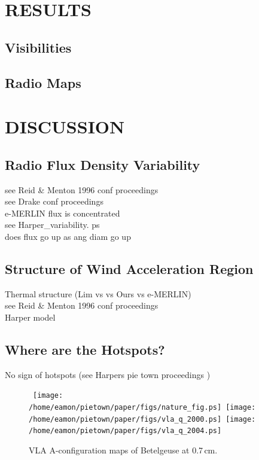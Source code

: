 \documentclass[iop]{emulateapj}
\begin{document}
\section{RESULTS} 
\subsection{Visibilities} 
\subsection{Radio Maps} 



\section{DISCUSSION}
\subsection{Radio Flux Density Variability} 
see Reid \& Menton 1996 conf proceedings\\
see Drake conf proceedings\\
e-MERLIN flux is concentrated\\
see Harper\_variability. ps\\
does flux go up as ang diam go up

\subsection{Structure of Wind Acceleration Region} 
Thermal structure (Lim vs vs Ours vs e-MERLIN)\\
see Reid \& Menton 1996 conf proceedings\\
Harper model

\subsection{Where are the Hotspots?}

No sign of hotspots (see Harpers pie town proceedings )




\begin{figure*}
\mbox{
\texttt{[image: /home/eamon/pietown/paper/figs/nature\_fig.ps]}
\texttt{[image: /home/eamon/pietown/paper/figs/vla\_q\_2000.ps]}
\texttt{[image: /home/eamon/pietown/paper/figs/vla\_q\_2004.ps]}
}
\caption{VLA A-configuration maps of Betelgeuse at 0.7\,cm. }
\label{fig:fig5}
\end{figure*}
\end{document}
